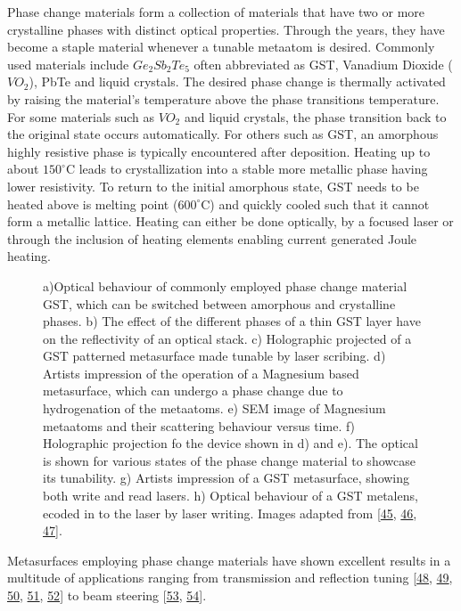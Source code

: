 \documentclass[a4paper,10pt,english,openany,oneside]{jupyterBook}
\begin{document}
\sphinxAtStartPar
Phase change materials form a collection of materials that have two or more crystalline phases with distinct optical properties. Through the years, they have become a staple material whenever a tunable meta\sphinxhyphen{}atom is desired. Commonly used materials include \(Ge_2Sb_2Te_5\) often abbreviated as GST, Vanadium Dioxide (\(VO_2\)), PbTe and liquid crystals. The desired phase change is thermally activated by raising the material’s temperature above the phase transitions temperature. For some materials such as \(VO_2\) and liquid crystals, the phase transition back to the original state occurs automatically. For others such as GST, an amorphous highly resistive phase is typically encountered after deposition. Heating up to about \(150^{\circ}\)C leads to crystallization into a stable more metallic phase having lower resistivity. To return to the initial amorphous state, GST needs to be heated above is melting point (\(600^{\circ}\)C) and quickly cooled such that it cannot form a metallic lattice. Heating can either be done optically, by a focused laser or through the inclusion of heating elements enabling current generated Joule heating.

\begin{figure}[htbp]
\centering
\capstart

\noindent{}
\caption{a)Optical behaviour of commonly employed phase change material GST, which can be switched between amorphous and crystalline phases. b) The effect of the different phases of a thin GST layer have on the reflectivity of an optical stack. c) Holographic projected of a GST patterned metasurface made tunable by laser scribing. d) Artists impression of the operation of a Magnesium based metasurface, which can undergo a phase change due to hydrogenation of the meta\sphinxhyphen{}atoms. e) SEM image of Magnesium meta\sphinxhyphen{}atoms and their scattering behaviour versus time. f) Holographic projection fo the device shown in d) and e). The optical is shown for various states of the phase change material to showcase its tunability. g) Artists impression of a GST metasurface, showing both write and read lasers. h) Optical behaviour of a GST metalens, ecoded in to the laser by laser writing. Images adapted from {[}\hyperlink{cite.bib:id227}{45}, \hyperlink{cite.bib:id17}{46}, \hyperlink{cite.bib:id332}{47}{]}.}\label{\detokenize{sota:chapter2-image12}}\end{figure}

\sphinxAtStartPar
Metasurfaces employing phase change materials have shown excellent results in a multitude of applications ranging from transmission and reflection tuning {[}\hyperlink{cite.bib:id417}{48}, \hyperlink{cite.bib:id372}{49}, \hyperlink{cite.bib:id374}{50}, \hyperlink{cite.bib:id62}{51}, \hyperlink{cite.bib:id474}{52}{]} to beam steering {[}\hyperlink{cite.bib:id173}{53}, \hyperlink{cite.bib:id155}{54}{]}.
\end{document}
